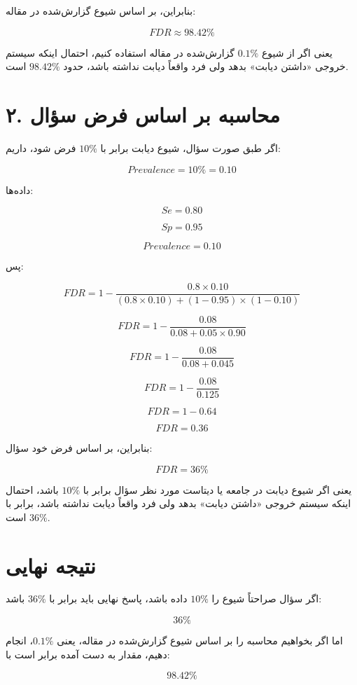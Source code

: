 \documentclass[]{exam}
\begin{document}
بنابراین، بر اساس شیوع گزارش‌شده در مقاله:

\[
\boxed{FDR \approx 98.42\%}
\]

یعنی اگر از شیوع \(0.1\%\) گزارش‌شده در مقاله استفاده کنیم، احتمال اینکه سیستم خروجی «داشتن دیابت» بدهد ولی فرد واقعاً دیابت نداشته باشد، حدود \(98.42\%\) است.

\section*{۲. محاسبه بر اساس فرض سؤال}

اگر طبق صورت سؤال، شیوع دیابت برابر با \(10\%\) فرض شود، داریم:

\[
Prevalence = 10\% = 0.10
\]

داده‌ها:

\[
Se = 0.80
\]

\[
Sp = 0.95
\]

\[
Prevalence = 0.10
\]

پس:

\[
FDR =
1 -
\frac{0.8 \times 0.10}
{(0.8 \times 0.10) + (1-0.95)\times(1-0.10)}
\]

\[
FDR =
1 -
\frac{0.08}
{0.08 + 0.05 \times 0.90}
\]

\[
FDR =
1 -
\frac{0.08}
{0.08 + 0.045}
\]

\[
FDR =
1 -
\frac{0.08}{0.125}
\]

\[
FDR = 1 - 0.64
\]

\[
FDR = 0.36
\]

بنابراین، بر اساس فرض خود سؤال:

\[
\boxed{FDR = 36\%}
\]

یعنی اگر شیوع دیابت در جامعه یا دیتاست مورد نظر سؤال برابر با \(10\%\) باشد، احتمال اینکه سیستم خروجی «داشتن دیابت» بدهد ولی فرد واقعاً دیابت نداشته باشد، برابر با \(36\%\) است.

\section*{نتیجه نهایی}

اگر سؤال صراحتاً شیوع را \(10\%\) داده باشد، پاسخ نهایی باید برابر با \(36\%\) باشد:

\[
\boxed{36\%}
\]

اما اگر بخواهیم محاسبه را بر اساس شیوع گزارش‌شده در مقاله، یعنی \(0.1\%\)، انجام دهیم، مقدار به دست آمده برابر است با:

\[
\boxed{98.42\%}
\]
\end{document}
